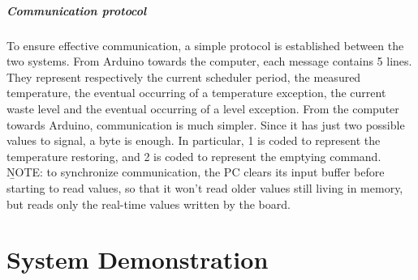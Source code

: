 \documentclass[a4paper,12pt]{report}
\begin{document}
	\paragraph{Communication protocol} To ensure effective communication, a simple protocol is established between the two systems.
	\newline From Arduino towards the computer, each message contains 5 lines. They represent respectively the current scheduler period, the measured temperature, the eventual occurring of a temperature exception, the current waste level and the eventual occurring of a level exception.
	\newline From the computer towards Arduino, communication is much simpler. Since it has just two possible values to signal, a byte is enough. In particular, 1 is coded to represent the temperature restoring, and 2 is coded to represent the emptying command.
	\newline \b{NOTE:} to synchronize communication, the PC clears its input buffer before starting to read values, so that it won't read older values still living in memory, but reads only the real-time values written by the board.
	
	\chapter{System Demonstration}
	
\end{document}
